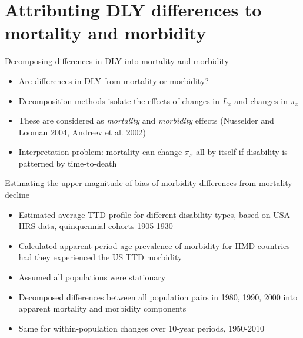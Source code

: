 \documentclass[20pt]{beamer}
\begin{document}
\section{Attributing DLY differences to mortality and morbidity}

\begin{frame}{Decomposing differences in DLY into mortality and morbidity}
\begin{itemize}[<+>]
\item Are differences in DLY from mortality or
morbidity?
\item Decomposition methods isolate the effects of changes in $L_x$ and changes
in $\pi_x$
\item These are considered as \textit{mortality} and \textit{morbidity} effects (Nusselder and Looman 2004, Andreev et al. 2002) 
\item Interpretation problem: mortality can change $\pi_x$ all by itself if
disability is patterned by time-to-death
\end{itemize}
\end{frame}
\begin{frame}{Estimating the upper magnitude of bias of morbidity differences from mortality decline}
\begin{itemize}[<+->]
\item Estimated average TTD profile for different disability types, based on USA HRS data, quinquennial cohorts 1905-1930
\item Calculated apparent period age prevalence of morbidity for HMD countries had they experienced the US TTD morbidity 
\item Assumed all populations were stationary
\item Decomposed differences between all population pairs in 1980, 1990, 2000 into apparent mortality and morbidity components
\item Same for within-population changes over 10-year periods, 1950-2010
\end{itemize}
\end{frame}
\end{document}
